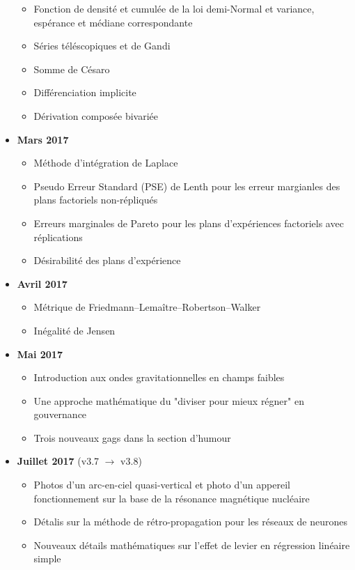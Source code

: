 \documentclass[12pt,a4paper,twoside,openright]{report}
\theoremstyle{definition}
\theoremstyle{itexmp}
\numberwithin{equation}{section}
\begin{document}
\begin{itemize}
\begin{itemize}[noitemsep]
				\item Fonction de densité et cumulée de la loi demi-Normal et variance, espérance et médiane correspondante
				\item Séries téléscopiques et de Gandi
				\item Somme de Césaro
				\item Différenciation implicite
				\item Dérivation composée bivariée
			\end{itemize}
		\item \textbf{Mars 2017}
			\begin{itemize}[noitemsep]
				\item Méthode d'intégration de Laplace
				\item Pseudo Erreur Standard (PSE) de Lenth pour les erreur margianles des plans factoriels non-répliqués
				\item Erreurs marginales de Pareto pour les plans d'expériences factoriels avec réplications
				\item Désirabilité des plans d'expérience
			\end{itemize}
		\item \textbf{Avril 2017}
			\begin{itemize}[noitemsep]
				\item Métrique de Friedmann–Lemaître–Robertson–Walker
				\item Inégalité de Jensen
			\end{itemize}
		\item \textbf{Mai 2017}
			\begin{itemize}[noitemsep]
				\item Introduction aux ondes gravitationnelles en champs faibles
				\item Une approche mathématique du "diviser pour mieux régner" en gouvernance
				\item Trois nouveaux gags dans la section d'humour
			\end{itemize}
		\item \textbf{Juillet 2017} (v3.7 $\rightarrow$ v3.8)
			\begin{itemize}[noitemsep]
				\item Photos d'un arc-en-ciel quasi-vertical et photo d'un appereil fonctionnement sur la base de la résonance magnétique nucléaire
				\item Détalis sur la méthode de rétro-propagation pour les réseaux de neurones
				\item Nouveaux détails mathématiques sur l'effet de levier en régression linéaire simple

\end{itemize}
\end{itemize}
\end{document}
